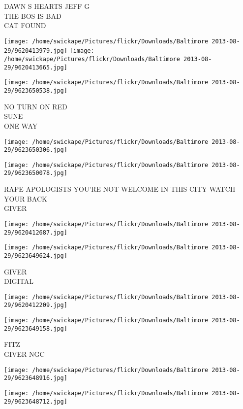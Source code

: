 \documentclass[10pt,letterpaper]{article}
\begin{document}
DAWN S HEARTS JEFF G\\
THE BOS IS BAD\\
CAT FOUND
\pagebreak

\texttt{[image: /home/swickape/Pictures/flickr/Downloads/Baltimore 2013-08-29/9620413979.jpg]}
\texttt{[image: /home/swickape/Pictures/flickr/Downloads/Baltimore 2013-08-29/9620413665.jpg]}

\vspace{0.25in}
\texttt{[image: /home/swickape/Pictures/flickr/Downloads/Baltimore 2013-08-29/9623650538.jpg]}

NO TURN ON RED\\
SUNE\\
ONE WAY
\pagebreak

\texttt{[image: /home/swickape/Pictures/flickr/Downloads/Baltimore 2013-08-29/9623650306.jpg]}

\vspace{0.25in}
\texttt{[image: /home/swickape/Pictures/flickr/Downloads/Baltimore 2013-08-29/9623650078.jpg]}

RAPE APOLOGISTS YOU'RE NOT WELCOME IN THIS CITY WATCH YOUR BACK\\
GIVER
\pagebreak

\texttt{[image: /home/swickape/Pictures/flickr/Downloads/Baltimore 2013-08-29/9620412687.jpg]}

\vspace{0.25in}
\texttt{[image: /home/swickape/Pictures/flickr/Downloads/Baltimore 2013-08-29/9623649624.jpg]}

GIVER\\
DIGITAL
\pagebreak

\texttt{[image: /home/swickape/Pictures/flickr/Downloads/Baltimore 2013-08-29/9620412209.jpg]}

\vspace{0.25in}
\texttt{[image: /home/swickape/Pictures/flickr/Downloads/Baltimore 2013-08-29/9623649158.jpg]}

FITZ\\
GIVER NGC
\pagebreak

\texttt{[image: /home/swickape/Pictures/flickr/Downloads/Baltimore 2013-08-29/9623648916.jpg]}

\vspace{0.25in}
\texttt{[image: /home/swickape/Pictures/flickr/Downloads/Baltimore 2013-08-29/9623648712.jpg]}
\end{document}
